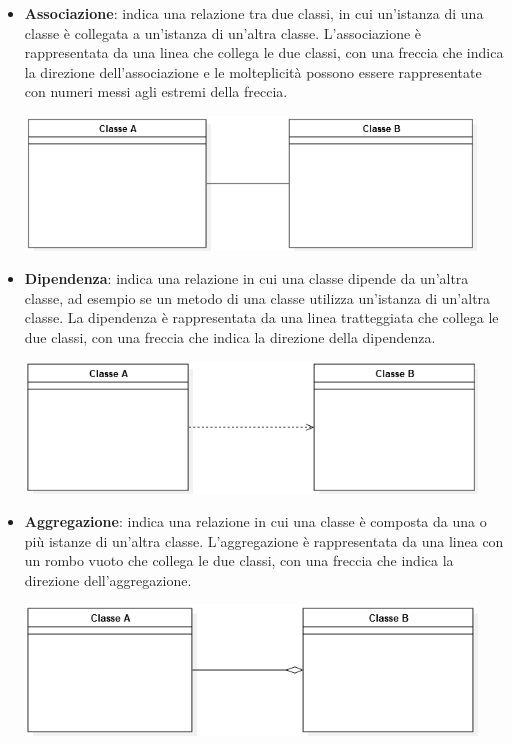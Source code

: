 \begin{itemize}
	\item \textbf{Associazione}: indica una relazione tra due classi, in cui un'istanza di una classe è collegata a un'istanza di un'altra classe. L'associazione è rappresentata da una linea che collega le due classi, con una freccia che indica la direzione dell'associazione e le molteplicità possono essere rappresentate con numeri messi agli estremi della freccia.
	      \begin{center}
		      \includegraphics*[width=12cm]{../../../images/norme_di_progetto/associazioneClassi.png}
	      \end{center}
	      \newpage
	\item \textbf{Dipendenza}: indica una relazione in cui una classe dipende da un'altra classe, ad esempio se un metodo di una classe utilizza un'istanza di un'altra classe. La dipendenza è rappresentata da una linea tratteggiata che collega le due classi, con una freccia che indica la direzione della dipendenza.
	      \begin{center}
		      \includegraphics*[width=12cm]{../../../images/norme_di_progetto/dipendenzaClassi.png}
	      \end{center}
	\item \textbf{Aggregazione}: indica una relazione in cui una classe è composta da una o più istanze di un'altra classe. L'aggregazione è rappresentata da una linea con un rombo vuoto che collega le due classi, con una freccia che indica la direzione dell'aggregazione.
	      \begin{center}
		      \includegraphics*[width=12cm]{../../../images/norme_di_progetto/aggregazioneClassi.png}

\end{center}
\end{itemize}

